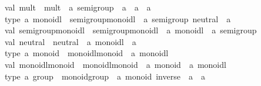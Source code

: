 \begin{isabellebody}
\begin{isamarkuptext}
val\ mult\ {}\ {}mult\ {}\ {}a\ semigroup\ {}{}\ {}a\ {}{}\ {}a\ {}{}\ {}a{}\isanewline
\isanewline
type\ {}a\ monoidl\ {}\ {}semigroup{}monoidl\ {}\ {}a\ semigroup{}\ neutral\ {}\ {}a{}{}\isanewline
val\ semigroup{}monoidl\ {}\ {}semigroup{}monoidl\ {}\ {}a\ monoidl\ {}{}\ {}a\ semigroup{}\isanewline
val\ neutral\ {}\ {}neutral\ {}\ {}a\ monoidl\ {}{}\ {}a{}\isanewline
\isanewline
type\ {}a\ monoid\ {}\ {}monoidl{}monoid\ {}\ {}a\ monoidl{}{}\isanewline
val\ monoidl{}monoid\ {}\ {}monoidl{}monoid\ {}\ {}a\ monoid\ {}{}\ {}a\ monoidl{}\isanewline
\isanewline
type\ {}a\ group\ {}\ {}monoid{}group\ {}\ {}a\ monoid{}\ inverse\ {}\ {}a\ {}{}\ {}a{}{}\isanewline

\end{isamarkuptext}
\end{isabellebody}
